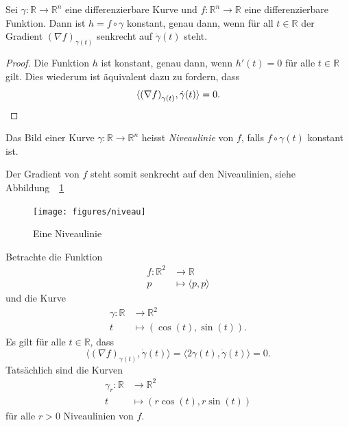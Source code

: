 \documentclass[../main.tex]{subfiles}
\begin{document}
\begin{proposition*}
  Sei $\gamma \colon \mathbb{R} \to \mathbb{R}^n$ 
  eine differenzierbare Kurve und 
  $f \colon \mathbb{R}^n \to \mathbb{R}$ eine
  differenzierbare Funktion.
  Dann ist $h = f \circ \gamma$ konstant, genau dann,
  wenn für all $t \in \mathbb{R}$ 
  der Gradient ${(\nabla f)}_{\gamma(t)}$ senkrecht auf
  $\dot \gamma(t)$ steht.
\end{proposition*}

\begin{proof}
  Die Funktion $h$ ist konstant, genau dann,
  wenn $h'(t) = 0$ für alle $t \in \mathbb{R}$ gilt.
  Dies wiederum ist äquivalent dazu zu fordern, dass
  \[
    \langle {(\nabla f)}_{\gamma(t)}, \dot \gamma(t) \rangle = 0.
    \qedhere
  \]
\end{proof}

\begin{definition}
  Das Bild einer Kurve $\gamma \colon \mathbb{R} \to \mathbb{R}^n$ 
  heisst \emph{Niveaulinie} von $f$,
  falls $f \circ \gamma(t)$ konstant ist.
\end{definition}

Der Gradient von $f$ steht somit senkrecht auf den Niveaulinien, siehe Abbildung~~\ref{fig:niveau}

\begin{figure}[htb]
  \centering
  \texttt{[image: figures/niveau]}
  \caption{Eine Niveaulinie}%
  \label{fig:niveau}
\end{figure}

\begin{example}
  Betrachte die Funktion
  \begin{align*}
    f \colon \mathbb{R}^2 & \to \mathbb{R} \\
    p & \mapsto \langle p, p \rangle
  \end{align*}
  und die Kurve
  \begin{align*}
    \gamma \colon \mathbb{R} & \to \mathbb{R}^2 \\
    t & \mapsto (\cos(t), \sin(t)).
  \end{align*}
  Es gilt für alle $t \in \mathbb{R}$,
  dass
  \[
  \langle {(\nabla f)}_{\gamma(t)}, \dot \gamma(t) \rangle
  = \langle 2 \gamma(t), \dot \gamma(t) \rangle = 0.
  \]
  Tatsächlich sind die Kurven
  \begin{align*}
    \gamma_r \colon \mathbb{R} & \to \mathbb{R}^2 \\
    t & \mapsto (r\cos(t), r\sin(t))
  \end{align*}
  für alle $r > 0$ Niveaulinien von $f$.
\end{example}
\end{document}
